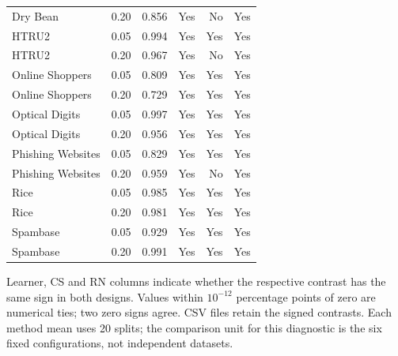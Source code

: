 \begin{table}[t]
\begin{tabularx}{\textwidth}{>{\raggedright\arraybackslash}Xrrrrr}
Dry Bean & 0.20 & 0.856 & Yes & No & Yes \\
HTRU2 & 0.05 & 0.994 & Yes & Yes & Yes \\
HTRU2 & 0.20 & 0.967 & Yes & No & Yes \\
Online Shoppers & 0.05 & 0.809 & Yes & Yes & Yes \\
Online Shoppers & 0.20 & 0.729 & Yes & Yes & Yes \\
Optical Digits & 0.05 & 0.997 & Yes & Yes & Yes \\
Optical Digits & 0.20 & 0.956 & Yes & Yes & Yes \\
Phishing Websites & 0.05 & 0.829 & Yes & Yes & Yes \\
Phishing Websites & 0.20 & 0.959 & Yes & No & Yes \\
Rice & 0.05 & 0.985 & Yes & Yes & Yes \\
Rice & 0.20 & 0.981 & Yes & Yes & Yes \\
Spambase & 0.05 & 0.929 & Yes & Yes & Yes \\
Spambase & 0.20 & 0.991 & Yes & Yes & Yes \\
\bottomrule
\end{tabularx}
\par\medskip
\begin{minipage}{\textwidth}\small
Learner, CS and RN columns indicate whether the respective contrast has the same sign in both designs. Values within $10^{-12}$ percentage points of zero are numerical ties; two zero signs agree. CSV files retain the signed contrasts. Each method mean uses 20 splits; the comparison unit for this diagnostic is the six fixed configurations, not independent datasets.
\end{minipage}
\end{table}
